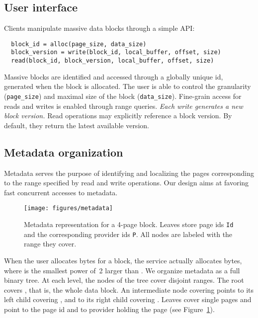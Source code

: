 \documentclass{llncs}
\newcommand{\myblock}[1]{\mbox{\lstinline{#1}}}
\begin{document}
\subsection{User interface}
\label{sec:API}

Clients manipulate massive data blocks through a simple API:
\begin{lstlisting}
  block_id = alloc(page_size, data_size)
  block_version = write(block_id, local_buffer, offset, size)
  read(block_id, block_version, local_buffer, offset, size)
\end{lstlisting}
Massive blocks are identified and accessed through a globally unique
id, generated when the block is allocated. The user is able to control
the granularity (\lstinline{page_size}) and maximal size of the block
(\lstinline{data_size}). Fine-grain access for reads and writes is enabled
through  range queries. \emph{Each write generates a new
block version.} Read operations may explicitly reference a block
version. By default, they return the latest available version.



\subsection{Metadata organization}
\label{sec:metadata}

Metadata serves the purpose of identifying and localizing the pages
corresponding to the range  specified by read and
write operations. Our design aims at favoring fast concurrent accesses
to metadata.

\begin{figure}
  \centerline{\texttt{[image: figures/metadata]}}\caption{Metadata representation for a 4-page block. Leaves store
    page ids \myblock{Id} and the corresponding provider ids
    \myblock{P}.
All nodes are
    labeled with the  range they cover.}\label{fig:metadata}
\end{figure}

When the user allocates  bytes for a block, the service
actually allocates  bytes, where  is
the smallest power of~2 larger than . We organize metadata
as a full binary tree. At each level, the nodes of the tree cover disjoint  ranges. The root covers , that is, the whole
data block.  An intermediate node covering  points to its
left child covering , and to its right child
covering . Leaves cover single pages
and point to the page id and to provider holding the page (see
Figure~\ref{fig:metadata}).
\end{document}
